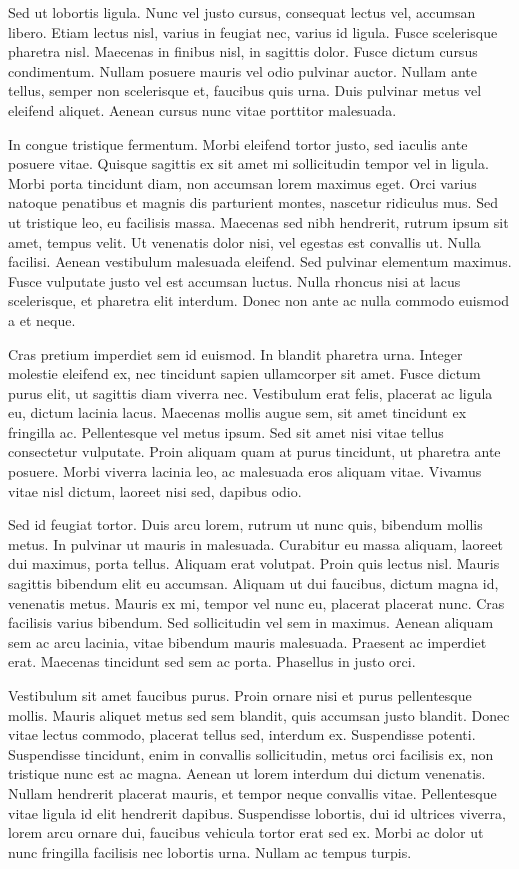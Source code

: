 \documentclass{article}
\begin{document}
Sed ut lobortis ligula. Nunc vel justo cursus, consequat lectus vel, accumsan libero. Etiam lectus nisl, varius in feugiat nec, varius id ligula. Fusce scelerisque pharetra nisl. Maecenas in finibus nisl, in sagittis dolor. Fusce dictum cursus condimentum. Nullam posuere mauris vel odio pulvinar auctor. Nullam ante tellus, semper non scelerisque et, faucibus quis urna. Duis pulvinar metus vel eleifend aliquet. Aenean cursus nunc vitae porttitor malesuada.

In congue tristique fermentum. Morbi eleifend tortor justo, sed iaculis ante posuere vitae. Quisque sagittis ex sit amet mi sollicitudin tempor vel in ligula. Morbi porta tincidunt diam, non accumsan lorem maximus eget. Orci varius natoque penatibus et magnis dis parturient montes, nascetur ridiculus mus. Sed ut tristique leo, eu facilisis massa. Maecenas sed nibh hendrerit, rutrum ipsum sit amet, tempus velit. Ut venenatis dolor nisi, vel egestas est convallis ut. Nulla facilisi. Aenean vestibulum malesuada eleifend. Sed pulvinar elementum maximus. Fusce vulputate justo vel est accumsan luctus. Nulla rhoncus nisi at lacus scelerisque, et pharetra elit interdum. Donec non ante ac nulla commodo euismod a et neque.

Cras pretium imperdiet sem id euismod. In blandit pharetra urna. Integer molestie eleifend ex, nec tincidunt sapien ullamcorper sit amet. Fusce dictum purus elit, ut sagittis diam viverra nec. Vestibulum erat felis, placerat ac ligula eu, dictum lacinia lacus. Maecenas mollis augue sem, sit amet tincidunt ex fringilla ac. Pellentesque vel metus ipsum. Sed sit amet nisi vitae tellus consectetur vulputate. Proin aliquam quam at purus tincidunt, ut pharetra ante posuere. Morbi viverra lacinia leo, ac malesuada eros aliquam vitae. Vivamus vitae nisl dictum, laoreet nisi sed, dapibus odio.

Sed id feugiat tortor. Duis arcu lorem, rutrum ut nunc quis, bibendum mollis metus. In pulvinar ut mauris in malesuada. Curabitur eu massa aliquam, laoreet dui maximus, porta tellus. Aliquam erat volutpat. Proin quis lectus nisl. Mauris sagittis bibendum elit eu accumsan. Aliquam ut dui faucibus, dictum magna id, venenatis metus. Mauris ex mi, tempor vel nunc eu, placerat placerat nunc. Cras facilisis varius bibendum. Sed sollicitudin vel sem in maximus. Aenean aliquam sem ac arcu lacinia, vitae bibendum mauris malesuada. Praesent ac imperdiet erat. Maecenas tincidunt sed sem ac porta. Phasellus in justo orci.

Vestibulum sit amet faucibus purus. Proin ornare nisi et purus pellentesque mollis. Mauris aliquet metus sed sem blandit, quis accumsan justo blandit. Donec vitae lectus commodo, placerat tellus sed, interdum ex. Suspendisse potenti. Suspendisse tincidunt, enim in convallis sollicitudin, metus orci facilisis ex, non tristique nunc est ac magna. Aenean ut lorem interdum dui dictum venenatis. Nullam hendrerit placerat mauris, et tempor neque convallis vitae. Pellentesque vitae ligula id elit hendrerit dapibus. Suspendisse lobortis, dui id ultrices viverra, lorem arcu ornare dui, faucibus vehicula tortor erat sed ex. Morbi ac dolor ut nunc fringilla facilisis nec lobortis urna. Nullam ac tempus turpis.
\end{document}
